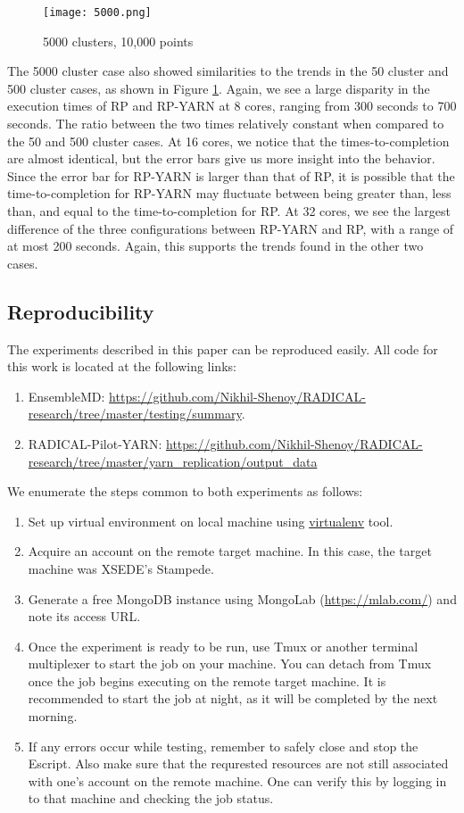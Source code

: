 \documentclass[]{article}
\begin{document}
			\begin{figure}[H]
				\centering
				\texttt{[image: 5000.png]}
				\caption{5000 clusters, 10,000 points}
				\label{fig:5000}
			\end{figure}

			The 5000 cluster case also showed similarities to the trends in the 50 cluster and 500 cluster cases, as shown in Figure \ref{fig:5000}. Again, we see a large disparity in the execution times of RP and RP-YARN at 8 cores, ranging from 300 seconds to 700 seconds. The ratio between the two times relatively constant when compared to the 50 and 500 cluster cases. At 16 cores, we notice that the times-to-completion are almost identical, but the error bars give us more insight into the behavior. Since the error bar for RP-YARN is larger than that of RP, it is possible that the time-to-completion for RP-YARN may fluctuate between being greater than, less than, and equal to the time-to-completion for RP. At 32 cores, we see the largest difference of the three configurations between RP-YARN and RP, with a range of at most 200 seconds. Again, this supports the trends found in the other two cases. 

	\subsection{Reproducibility}
		The experiments described in this paper can be reproduced easily. All code for this work is located at the following links:
		\begin{enumerate}
			\item EnsembleMD: \url{https://github.com/Nikhil-Shenoy/RADICAL-research/tree/master/testing/summary}. 
			\item RADICAL-Pilot-YARN: \url{https://github.com/Nikhil-Shenoy/RADICAL-research/tree/master/yarn_replication/output_data}
		\end{enumerate}

		We enumerate the steps common to both experiments as follows:
		\begin{enumerate}
			\item Set up virtual environment on local machine using \url{virtualenv} tool.
			\item Acquire an account on the remote target machine. In this case, the target machine was XSEDE's Stampede.
			\item Generate a free MongoDB instance using MongoLab (\url{https://mlab.com/}) and note its access URL.	
			\item Once the experiment is ready to be run, use Tmux or another terminal multiplexer to start the job on your machine. You can detach from Tmux once the job begins executing on the remote target machine. It is recommended to start the job at night, as it will be completed by the next morning.
			\item If any errors occur while testing, remember to safely close and stop the Escript. Also make sure that the requrested resources are not still associated with one's account on the remote machine. One can verify this by logging in to that machine and checking the job status.
		\end{enumerate}
\end{document}
